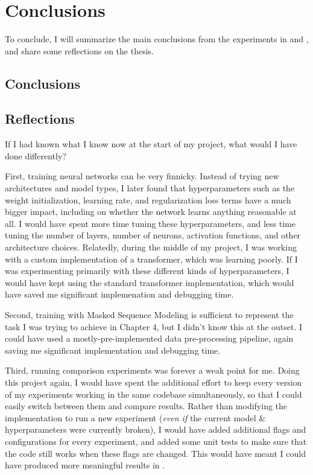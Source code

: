 \chapter{Conclusions}
\label{C:conclusion}

To conclude, I will summarize the main conclusions from the experiments in  and , and share some reflections on the thesis.

\section{Conclusions}


\section{Reflections}

If I had known what I know now at the start of my project, what would I have done differently?

First, training neural networks can be very finnicky. Instead of trying new architectures and model types, I later found that hyperparameters such as the weight initialization, learning rate, and regularization loss terms have a much bigger impact, including on whether the network learns anything reasonable at all. I would have spent more time tuning these hyperparameters, and less time tuning the number of layers, number of neurons, activation functions, and other architecture choices. Relatedly, during the middle of my project, I was working with a custom implementation of a transformer, which was learning poorly. If I was experimenting primarily with these different kinds of hyperparameters, I would have kept using the standard transformer implementation, which would have saved me significant implemenation and debugging time.

Second, training with Masked Sequence Modeling is sufficient to represent the task I was trying to achieve in Chapter 4, but I didn't know this at the outset. I could have used a mostly-pre-implemented data pre-processing pipeline, again saving me significant implementation and debugging time.

Third, running comparison experiments was forever a weak point for me. Doing this project again, I would have spent the additional effort to keep every version of my experiments working in the same codebase simultaneously, so that I could easily switch between them and compare results. Rather than modifying the implementation to run a new experiment (\textit{even if} the current model \& hyperparameters were currently broken), I would have added additional flags and configurations for every experiment, and added some unit tests to make sure that the code still works when these flags are changed.  This would have meant I could have produced more meaningful results in .

